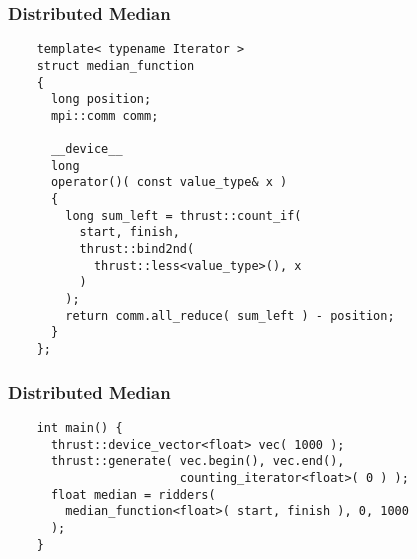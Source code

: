 \begin{frame}[fragile]
  \frametitle{Distributed Median}
  \begin{example}
    \begin{lstlisting}
    template< typename Iterator >
    struct median_function
    {
      long position;
      mpi::comm comm;

      __device__
      long
      operator()( const value_type& x )
      {
        long sum_left = thrust::count_if(
          start, finish,
          thrust::bind2nd(
            thrust::less<value_type>(), x
          )
        );
        return comm.all_reduce( sum_left ) - position;
      }
    };
    \end{lstlisting}
  \end{example}
\end{frame}

\begin{frame}[fragile]
  \frametitle{Distributed Median}
  \begin{example}
    \begin{lstlisting}
    int main() {
      thrust::device_vector<float> vec( 1000 );
      thrust::generate( vec.begin(), vec.end(),
                        counting_iterator<float>( 0 ) );
      float median = ridders(
        median_function<float>( start, finish ), 0, 1000
      );
    }
    \end{lstlisting}
  \end{example}
\end{frame}
